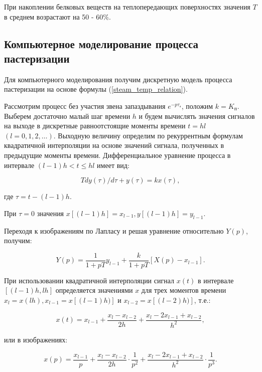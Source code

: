 При накоплении белковых веществ на теплопередающих поверхностях значения $T$ в среднем возрастают на 50 - 60\%.

\subsection{Компьютерное моделирование процесса пастеризации}

Для компьютерного моделирования получим дискретную модель процесса пастеризации на основе формулы (\ref{steam_temp_relation}).

Рассмотрим процесс без участия звена запаздывания $e^{-p \tau_\text{з}}$, положим $k = K_\text{п}$. Выберем достаточно малый шаг времени $h$ и будем вычислять значения сигналов на выходе в дискретные равноотстоящие моменты времени $t = hl$ $(l = 0, 1, 2, \ldots)$. Выходную величину определим по рекуррентным формулам квадратичной интерполяции на основе значений сигнала, полученных в предыдущие моменты времени. Дифференциальное уравнение процесса в интервале $(l - 1)h < t \le hl$ имеет вид:

\begin{equation}
    Tdy(\tau)/d\tau + y(\tau) = kx(\tau),
\end{equation}

где $\tau = t - (l - 1)h$.

При $\tau = 0$ значения $x[(l - 1)h] = x_{l - 1}, y[(l - 1)h] = y_{l - 1}$.

Переходя к изображениям по Лапласу и решая уравнение относительно $Y(p)$, получим:

\begin{equation}
    Y(p) = \frac{1}{1 + pT}y_{l - 1}+\frac{k}{1 + pT}[X(p) - x_{l - 1}].
\end{equation}

При использовании квадратичной интерполяции сигнал $x(t)$ в интервале $[(l - 1)h, lh]$ определяется значениями $x$ для трех моментов времени $x_l = x(lh), x_{l - 1} = x[(l - 1)h)]$ и $x_{l - 2} = x[(l - 2)h)]$, т.е.:

\begin{equation}
    x(t) = x_{l - 1} + \frac{x_l - x_{l - 2}}{2h} + \frac{x_l - 2x_{l - 1}+ x_{l - 2}}{h^2},
\end{equation}

или в изображениях:

\begin{equation}
    x(p) = \frac{x_{l - 1}}{p} + \frac{x_l - x_{l - 2}}{2h}\cdot\frac{1}{p^2} + \frac{x_l - 2x_{l - 1} + x_{l - 2}}{h^2}\cdot\frac{1}{p^3}.
\end{equation}

